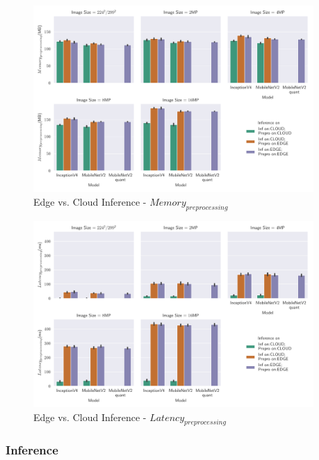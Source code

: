 \begin{figure}[!htb]
\centering
\includegraphics[width=0.95\textwidth]{./Bilder/single_plots/edge_vs_cloud_plots/Edge_vs_Cloud_Inference_Preprocessing_Memory.pdf}
\caption{Edge vs. Cloud Inference -  $Memory_{preprocessing}$}
\label{fig:EdgeVsCloudPreproMemory}
\end{figure}

\begin{figure}[!htb]
\centering
\includegraphics[width=0.95\textwidth]{./Bilder/single_plots/edge_vs_cloud_plots/Edge_vs_Cloud_Inference_Preprocessing_Latencies.pdf}
\caption{Edge vs. Cloud Inference -  $Latency_{preprocessing}$}
\label{fig:EdgeVsCloudPreproLat}
\end{figure}

\FloatBarrier
\subsubsection{Inference}
